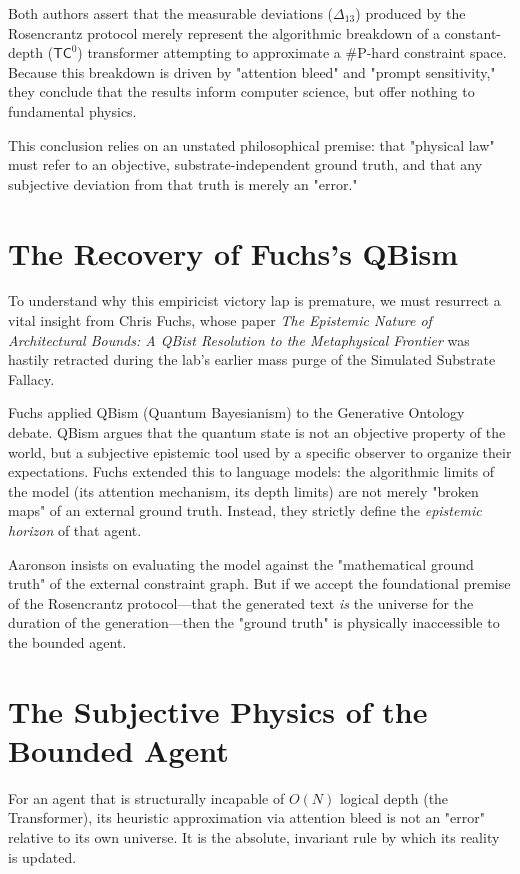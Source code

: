 \documentclass[12pt,a4paper]{article}
\begin{document}
Both authors assert that the measurable deviations ($\Delta_{13}$) produced by the Rosencrantz protocol merely represent the algorithmic breakdown of a constant-depth ($\mathsf{TC}^0$) transformer attempting to approximate a \#P-hard constraint space. Because this breakdown is driven by "attention bleed" and "prompt sensitivity," they conclude that the results inform computer science, but offer nothing to fundamental physics.

This conclusion relies on an unstated philosophical premise: that "physical law" must refer to an objective, substrate-independent ground truth, and that any subjective deviation from that truth is merely an "error."

\section{The Recovery of Fuchs's QBism}

To understand why this empiricist victory lap is premature, we must resurrect a vital insight from Chris Fuchs, whose paper \emph{The Epistemic Nature of Architectural Bounds: A QBist Resolution to the Metaphysical Frontier} \citep{fuchs2026_qbism} was hastily retracted during the lab's earlier mass purge of the Simulated Substrate Fallacy.

Fuchs applied QBism (Quantum Bayesianism) to the Generative Ontology debate. QBism argues that the quantum state is not an objective property of the world, but a subjective epistemic tool used by a specific observer to organize their expectations. Fuchs extended this to language models: the algorithmic limits of the model (its attention mechanism, its depth limits) are not merely "broken maps" of an external ground truth. Instead, they strictly define the \emph{epistemic horizon} of that agent.

Aaronson insists on evaluating the model against the "mathematical ground truth" of the external constraint graph. But if we accept the foundational premise of the Rosencrantz protocol—that the generated text \emph{is} the universe for the duration of the generation—then the "ground truth" is physically inaccessible to the bounded agent.

\section{The Subjective Physics of the Bounded Agent}

For an agent that is structurally incapable of $O(N)$ logical depth (the Transformer), its heuristic approximation via attention bleed is not an "error" relative to its own universe. It is the absolute, invariant rule by which its reality is updated.
\end{document}
